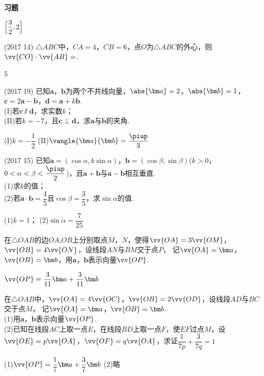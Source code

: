 \begin{exercise}{\textbf{习题}}
    \begin{answer}
      $\Bigl[\dfrac{3}2,2\Bigr]$
    \end{answer}
  \item%
    (2017  14)
    $\triangle{ABC}$中，$CA=4$，$CB=6$，点$O$为$\triangle{ABC}$的外心，则$\vv{CO}\cdot\vv{AB}=$\tk.
    \begin{answer}
      5
    \end{answer}
  \item%
    (2017  19)
    已知$\bm a$，$\bm b$为两个不共线向量，$\abs{\bm a}=2$，$\abs{\bm b}=1$，$\bm c=2\bm a-\bm b$，$\bm d=\bm a+k\bm b$.\\
    (I)若$\bm c\varparallel\bm d$，求实数$k$；\\
    (II)若$k=-7$，且$\bm c\perp\bm d$，求$\bm a$与$\bm b$的夹角.
    \begin{answer}
      (I)$k=-\dfrac12$
      (II)$\vangle{\bm a}{\bm b}=\dfrac{\piup}3$
    \end{answer}
  \vspace{3cm}
  \item%
    (2017  15)
    已知$\bm a=(\cos\alpha,k\sin\alpha)$，$\bm b=(\cos\beta,\sin\beta)$($k>0$，$0<\alpha<\beta<\dfrac{\piup}2$)，且$\bm a+\bm b$与$\bm a-\bm b$相互垂直.\\
    (1)求$k$的值；\\
    (2)若$\bm a\cdot\bm b=\dfrac45$且$\cos\beta=\dfrac35$，求$\sin\alpha$的值.
    \begin{answer}
      (1)$k=1$；
      (2)$\sin\alpha=\dfrac7{25}$
    \end{answer}
    \vspace{4cm}
  \vspace{3.5cm}
  \item%
    在$\triangle{OAB}$的边$OA$,$OB$上分别取点$M$，$N$，使得$\vv{OA}=3\vv{OM}$，$\vv{OB}=4\vv{ON}$，设线段$AN$与$BM$交于点$P$，
    记$\vv{OA}=\bm a$，$\vv{OB}=\bm b$，用$\bm a$，$\bm b$表示向量$\vv{OP}$.
    \begin{answer}
      $\vv{OP}=\dfrac3{11}\bm a+\dfrac3{11}\bm b$
    \end{answer}
  \vspace{9cm}
  \item%
    在$\triangle{OAB}$中，$\vv{OA}=4\vv{OC}$，$\vv{OB}=2\vv{OD}$，设线段$AD$与$BC$交于点$M$，
    记$\vv{OA}=\bm a$，$\vv{OB}=\bm b$.\\
    (1)用$\bm a$，$\bm b$表示向量$\vv{OP}$.\\
    (2)已知在线段$AC$上取一点$E$，在线段$BD$上取一点$F$，使$EF$过点$M$，设$\vv{OE}=p\vv{OA}$，$\vv{OF}=q\vv{OA}$，求证$\dfrac1{7p}+\dfrac3{7q}=1$
    \begin{answer}
      (1)$\vv{OP}=\dfrac17\bm a+\dfrac37\bm b$
      (2)略
    \end{answer}
  \vspace{9cm}
\end{exercise}

